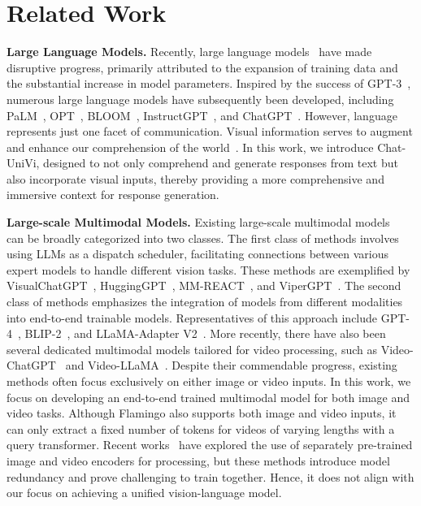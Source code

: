 \documentclass[10pt,twocolumn,letterpaper]{article}
\newcommand{\myparagraph}[1]{\textbf{#1}\hspace{1.8ex}}
\begin{document}
\section{Related Work}
\noindent \myparagraph{Large Language Models.} 
Recently, large language models~\cite{kenton2019bert,radford2019language,raffel2020exploring,vaswani2017attention} have made disruptive progress, primarily attributed to the expansion of training data and the substantial increase in model parameters. Inspired by the success of GPT-3~\cite{brown2020language}, numerous large language models have subsequently been developed, including PaLM~\cite{chowdhery2022palm}, OPT~\cite{zhang2022opt}, BLOOM~\cite{scao2022bloom}, InstructGPT~\cite{ouyang2022training}, and ChatGPT~\cite{chatgpt}. However, language represents just one facet of communication. Visual information serves to augment and enhance our comprehension of the world~\cite{labiosavisual,jin2022expectation,jin2023diffusionret,jin2023video,bain2021frozen,wang2022omnivl,ijcai2023p0104}. In this work, we introduce Chat-UniVi, designed to not only comprehend and generate responses from text but also incorporate visual inputs, thereby providing a more comprehensive and immersive context for response generation.

\noindent \myparagraph{Large-scale Multimodal Models.} 
Existing large-scale multimodal models~\cite{bai2023qwen,chen2023shikra,wu2023next,zheng2023minigpt,chen2023minigpt,gao2023llama,gong2023multimodal,chen2023x,li2022blip} can be broadly categorized into two classes. The first class of methods involves using LLMs as a dispatch scheduler, facilitating connections between various expert models to handle different vision tasks. These methods are exemplified by VisualChatGPT~\cite{wu2023visual}, HuggingGPT~\cite{shen2023hugginggpt}, MM-REACT~\cite{yang2023mm}, and ViperGPT~\cite{suris2023vipergpt}. The second class of methods emphasizes the integration of models from different modalities into end-to-end trainable models. Representatives of this approach include GPT-4~\cite{gpt4}, BLIP-2~\cite{li2023blip}, and LLaMA-Adapter V2~\cite{gao2023llama}. More recently, there have also been several dedicated multimodal models tailored for video processing, such as Video-ChatGPT~\cite{maaz2023video} and Video-LLaMA~\cite{zhang2023video}. Despite their commendable progress, existing methods often focus exclusively on either image or video inputs. In this work, we focus on developing an end-to-end trained multimodal model for both image and video tasks. Although Flamingo also supports both image and video inputs, it can only extract a fixed number of tokens for videos of varying lengths with a query transformer. Recent works~\cite{wu2023next,chen2023x} have explored the use of separately pre-trained image and video encoders for processing, but these methods introduce model redundancy and prove challenging to train together. Hence, it does not align with our focus on achieving a unified vision-language model. 
\end{document}
